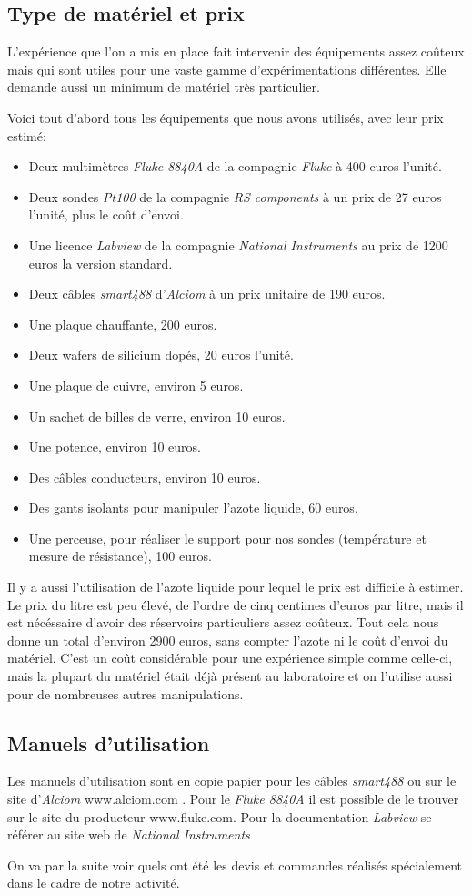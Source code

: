 \subsection{Type de matériel et prix}
L'expérience que l'on a mis en place fait intervenir des équipements assez coûteux mais qui sont utiles pour une vaste gamme d'expérimentations différentes. Elle demande aussi un minimum de matériel très particulier.

\bigskip
Voici tout d'abord tous les équipements que nous avons utilisés, avec leur prix estimé:

\begin{itemize}
  \item Deux multimètres \emph{Fluke 8840A} de la compagnie \emph{Fluke} à 400 euros l'unité.
  \item Deux sondes \emph{Pt100} de la compagnie \emph{RS components} à un prix de 27 euros l'unité, plus le coût d'envoi.
  \item Une licence \emph{Labview} de la compagnie \emph{National Instruments} au prix de 1200 euros la version standard.
  \item Deux câbles \emph{smart488} d'\emph{Alciom} à un prix unitaire de 190 euros.
  \item Une plaque chauffante, 200 euros.
  \item Deux wafers de silicium dopés, 20 euros l'unité.
  \item Une plaque de cuivre, environ 5 euros.
  \item Un sachet de billes de verre, environ 10 euros.
  \item Une potence, environ 10 euros. 
  \item Des câbles conducteurs, environ 10 euros.
  \item Des gants isolants pour manipuler l'azote liquide, 60 euros.
  \item Une perceuse, pour réaliser le support pour nos sondes (température et mesure de résistance), 100 euros.
\end{itemize}

\bigskip
Il y a aussi l'utilisation de l'azote liquide pour lequel le prix est difficile à estimer. Le prix du litre est peu élevé, de l'ordre de cinq centimes d'euros par litre, mais il est nécéssaire d'avoir des réservoirs particuliers assez coûteux.
Tout cela nous donne un total d'environ 2900 euros, sans compter l'azote ni le coût d'envoi du matériel.
C'est un coût considérable pour une expérience simple comme celle-ci, mais la plupart du matériel était déjà présent au 
laboratoire et on l'utilise aussi pour de nombreuses autres manipulations.


\subsection{Manuels d'utilisation}
Les manuels d'utilisation sont en copie papier pour les câbles \emph{smart488} ou sur le site d'\emph{Alciom} www.alciom.com . Pour le \emph{Fluke 8840A} il est possible de le trouver sur le site du producteur www.fluke.com. Pour la documentation \emph{Labview} se référer au site web de \emph{National Instruments}

On va par la suite voir quels ont été les devis et commandes réalisés spécialement dans le cadre de notre activité.

